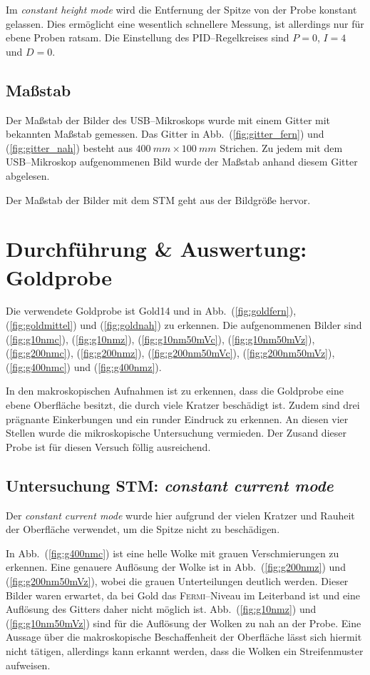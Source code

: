 \documentclass[sn-mathphys-num,iicol]{sn-jnl}
\theoremstyle{thmstyleone}
\theoremstyle{thmstyletwo}
\theoremstyle{thmstylethree}
\begin{document}
Im \textit{constant height mode} wird die Entfernung der Spitze von der Probe konstant gelassen.
Dies ermöglicht eine wesentlich schnellere Messung, ist allerdings nur für ebene Proben ratsam.
Die Einstellung des PID--Regelkreises sind $P=0$, $I=4$ und $D=0$.

\subsection{Maßstab}
Der Maßstab der Bilder des USB--Mikroskops wurde mit einem Gitter mit bekannten Maßstab gemessen.
Das Gitter in Abb.\ (\ref{fig:gitter_fern}) und (\ref{fig:gitter_nah}) besteht aus $\SI{400}{mm}\times \SI{100}{mm}$ Strichen.
Zu jedem mit dem USB--Mikroskop aufgenommenen Bild wurde der Maßstab anhand diesem Gitter abgelesen.

Der Maßstab der Bilder mit dem STM geht aus der Bildgröße hervor.

\section{Durchführung \& Auswertung:\\Goldprobe}
Die verwendete Goldprobe ist \glqq Gold14\grqq{} und in Abb.\ (\ref{fig:goldfern}), (\ref{fig:goldmittel}) und (\ref{fig:goldnah}) zu erkennen.
Die aufgenommenen Bilder sind (\ref{fig:g10nmc}), (\ref{fig:g10nmz}), (\ref{fig:g10nm50mVc}), (\ref{fig:g10nm50mVz}), (\ref{fig:g200nmc}), (\ref{fig:g200nmz}), (\ref{fig:g200nm50mVc}), (\ref{fig:g200nm50mVz}), (\ref{fig:g400nmc}) und (\ref{fig:g400nmz}).

In den makroskopischen Aufnahmen ist zu erkennen, dass die Goldprobe eine ebene Oberfläche besitzt, die durch viele Kratzer beschädigt ist.
Zudem sind drei prägnante Einkerbungen und ein runder Eindruck zu erkennen.
An diesen vier Stellen wurde die mikroskopische Untersuchung vermieden. %
Der Zusand dieser Probe ist für diesen Versuch föllig ausreichend. %

\subsection{Untersuchung STM: \textit{constant current mode}}
Der \textit{constant current mode} wurde hier aufgrund der vielen Kratzer und Rauheit der Oberfläche verwendet, um die Spitze nicht zu beschädigen.

In Abb.\ (\ref{fig:g400nmc}) ist eine helle Wolke mit grauen Verschmierungen zu erkennen. 
Eine genauere Auflösung der Wolke ist in Abb.\ (\ref{fig:g200nmz}) und (\ref{fig:g200nm50mVz}), wobei die grauen Unterteilungen deutlich werden.
Dieser Bilder waren erwartet, da bei Gold das \textsc{Fermi}--Niveau im Leiterband ist und eine Auflösung des Gitters daher nicht möglich ist.
Abb.\ (\ref{fig:g10nmz}) und (\ref{fig:g10nm50mVz}) sind für die Auflösung der Wolken zu nah an der Probe.
Eine Aussage über die makroskopische Beschaffenheit der Oberfläche lässt sich hiermit nicht tätigen, allerdings kann erkannt werden, dass die Wolken ein Streifenmuster aufweisen.
\end{document}
